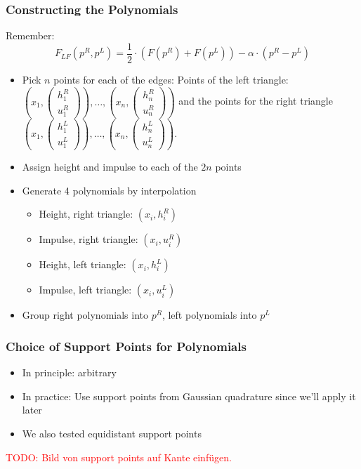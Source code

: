 \documentclass{beamer}
\newcommand{\todo}[1]{\textcolor{red}{TODO: #1}}
\begin{document}
\begin{frame}
  \frametitle{Constructing the Polynomials}
  Remember:
  \begin{equation*}
    F_{LF}(p^R,p^L) = \dfrac{1}{2}\cdot (F(p^R) + F(p^L)) - \alpha \cdot (p^R - p^L)
  \end{equation*}
  \begin{itemize}
  \item Pick $n$ points for each of the edges: Points of the left triangle:
    $\left(x_1,\begin{pmatrix}
        h_1^R \\ u_1^R
      \end{pmatrix}\right), \dots , \left(x_n, \begin{pmatrix}
        h_n^R \\ u_n^R
      \end{pmatrix}\right)$ and the points for the right triangle 
    $\left(x_1,\begin{pmatrix}
        h_1^L \\ u_1^L
      \end{pmatrix}\right), \dots , \left(x_n,\begin{pmatrix}
        h_n^L \\ u_n^L
      \end{pmatrix}\right)$.
  \item Assign height and impulse to each of the $2n$ points
  \item Generate 4 polynomials by interpolation
    \begin{itemize}
    \item Height, right triangle: $(x_i, h_i^R)$
    \item Impulse, right triangle: $(x_i, u_i^R)$
    \item Height, left triangle: $(x_i, h_i^L)$
    \item Impulse, left triangle: $(x_i, u_i^L)$
    \end{itemize}
  \item Group right polynomials into $p^R$, left polynomials into $p^L$
  \end{itemize}
\end{frame}

\begin{frame}
  \frametitle{Choice of Support Points for Polynomials}
  \begin{itemize}
  \item In principle: arbitrary
  \item In practice: Use support points from Gaussian quadrature since we'll apply it later
  \item We also tested equidistant support points
  \end{itemize}
  \todo{Bild von support points auf Kante einfügen.}
\end{frame}
\end{document}

